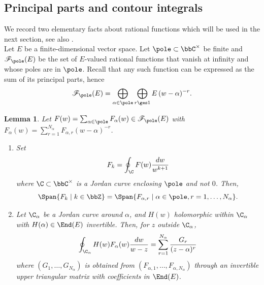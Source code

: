 \documentclass[reqno]{amsart}
\newcommand{\nc}{\newcommand}
\numberwithin{equation}{section}
\newtheorem*{lemma}{Lemma}
\begin{document}

\nc{\FP}{\mathscr{F}_{\pole}}
\nc{\Sub}{\operatorname{Sub}}

\subsection{Principal parts and contour integrals}\label{ss:principal-parts-moments}

We record two elementary facts about rational functions which will be used in the next section, see also \cite{appel-gautam-26}.\\

Let $E$ be a finite-dimensional vector space. Let $\pole\subset\bbC^\times$ be finite and $\FP(E)$ be the set of $E$-valued rational functions that vanish at infinity and whose poles are in $\pole$. 
Recall that any such function can be expressed as the sum of its principal parts, hence
\begin{equation}
\FP(E)
=
\bigoplus_{\alpha\in\pole}\bigoplus_{r\ges1}
E\,(w-\alpha)^{-r}.
\end{equation}

\begin{lemma}\label{lem:principal-parts-moments}
Let 
$F(w)=
\sum_{\alpha\in\pole}F_{\alpha}(w)
\in\FP(E)$ with $F_{\alpha}(w)=\sum_{r=1}^{N_\alpha}
F_{\alpha,r}(w-\alpha)^{-r}$.
\begin{enumerate}
\item 
Set
\[
F_k=\oint_{\C} F(w)\frac{dw}{w^{k+1}}
\]
where $\C\subset\bbC^\times$ is a Jordan curve enclosing $\pole$ and not $0$.
Then,
\begin{equation}\label{eq:modes-principal-parts-equivalence}
	\Span\{F_k\mid k\in\bbZ\}=
	\Span\{F_{\alpha,r}\mid \alpha\in\pole,r=1,\dots, N_{\alpha}\}.
\end{equation}
\item Let $\C_\alpha$ be a Jordan curve around $\alpha$, and $H(w)$ holomorphic within $\C_{\alpha}$ with $H(\alpha)\in\End(E)$ invertible. Then, for $z$ outside $\C_\alpha$,
\begin{align}
\oint_{\C_\alpha}H(w)F_\alpha(w)\frac{dw}{w-z}=\sum_{r=1}^{N_\alpha}\frac{G_r}{(z-\alpha)^r}	
\end{align}
where $(G_1,\dots, G_{N_{\alpha}})$
is obtained from $(F_{\alpha,1},\dots, F_{\alpha, N_{\alpha}})$ through an invertible upper triangular matrix with coefficients in $\End(E)$.
\end{enumerate}
\end{lemma}
\end{document}
